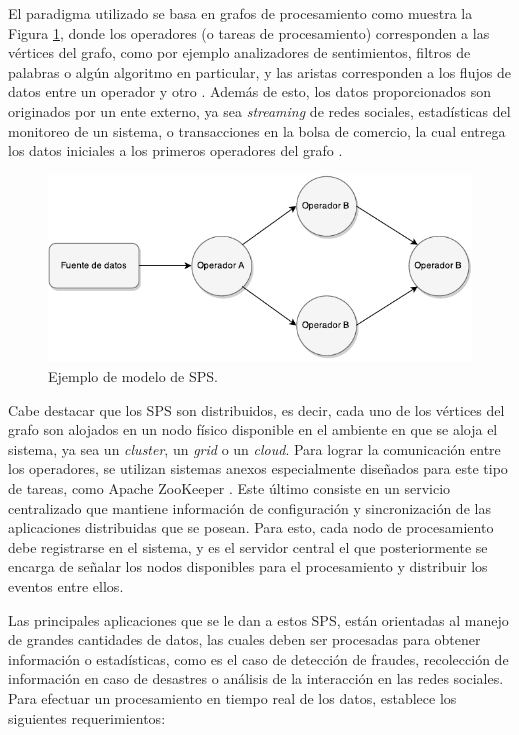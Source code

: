 El paradigma utilizado se basa en grafos de procesamiento como muestra la Figura \ref{fig:grafo}, donde los operadores (o tareas de procesamiento) corresponden a las v\'ertices del grafo, como por ejemplo analizadores de sentimientos, filtros de palabras o alg\'un algoritmo en particular, y las aristas corresponden a los flujos de datos entre un operador y otro \citep{Shahrivari14}. Adem\'as de esto, los datos proporcionados son originados por un ente externo, ya sea \textit{streaming} de redes sociales, estad\'isticas del monitoreo de un sistema, o transacciones en la bolsa de comercio, la cual entrega los datos iniciales a los primeros operadores del grafo \citep{AppelFFB12}.

\begin{figure}[ht!]
  \centering
    \includegraphics[scale=1]{images/SPS.pdf}
  \caption{Ejemplo de modelo de SPS.}
  \label{fig:grafo}
\end{figure}

Cabe destacar que los SPS son distribuidos, es decir, cada uno de los v\'ertices del grafo son alojados en un nodo f\'isico disponible en el ambiente en que se aloja el sistema, ya sea un \textit{cluster}, un \textit{grid} o un \textit{cloud}. Para lograr la comunicaci\'on entre los operadores, se utilizan sistemas anexos especialmente dise\~nados para este tipo de tareas, como Apache ZooKeeper \citep{HuntKJR10}. Este \'ultimo consiste en un servicio centralizado que mantiene informaci\'on de configuraci\'on y sincronizaci\'on de las aplicaciones distribuidas que se posean. \normalsize{Para esto, cada nodo de procesamiento debe registrarse en el sistema, y es el servidor central el que posteriormente se encarga de se\~nalar los nodos disponibles para el procesamiento y distribuir los eventos entre ellos.}

Las principales aplicaciones que se le dan a estos SPS, est\'an orientadas al manejo de grandes cantidades de datos, las cuales deben ser procesadas para obtener informaci\'on o estad\'isticas, como es el caso de detecci\'on de fraudes, recolecci\'on de informaci\'on en caso de desastres o an\'alisis de la interacci\'on en las redes sociales. Para efectuar un procesamiento en tiempo real de los datos, \citep{StonebrakerCZ05} establece los siguientes requerimientos:

